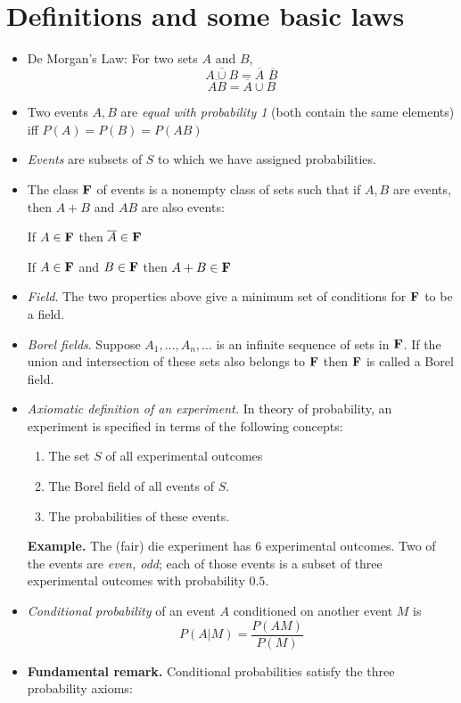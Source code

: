 \documentclass[a4paper, oneside]{book}
\begin{document}
\section{Definitions and some basic laws}
\begin{itemize}
\item De Morgan's Law: For two sets $A$ and $B$, $$\overline{A\cup B}=\overline{A}\,\,\overline{B}$$
$$\overline{AB}=\overline{A}\cup\overline{B}$$
\item Two events $A,B$ are \textit{equal with probability 1} (\ie both contain the same elements) iff $P(A)=P(B)=P(AB)$
\item \textit{Events} are subsets of $S$ to which we have assigned probabilities.
\item The class $\mathbf{F}$ of events is a nonempty class of sets such that if $A,B$ are events, then $A+B$ and $AB$ are also events:
\begin{center}If $A\in \mathbf{F}$ then $\overline{A}\in\mathbf{F}$\end{center}
\begin{center}If $A\in \mathbf{F}$ and $B\in \mathbf{F}$ then $A+B\in\mathbf{F}$ \end{center}
\item \textit{Field}. The two properties above give a minimum set of conditions for $\mathbf{F}$ to be a field. 
\item \textit{Borel fields}. Suppose $A_1, \hdots, A_n, \hdots$ is an infinite sequence of sets in $\mathbf{F}$. If the union and intersection of these sets also belongs to $\mathbf{F}$ then $\mathbf{F}$ is called a Borel field.  
\item \textit{Axiomatic definition of an experiment.} In theory of probability, an experiment is specified in terms of the following concepts:
\begin{enumerate}[1.]
\item The set $S$ of all experimental outcomes
\item The Borel field of all events of $S$.
\item The probabilities of these events.
\end{enumerate}
%
\textbf{Example.} The (fair) die experiment has 6 experimental outcomes. Two of the events are \textit{even, odd}; each of those events is a subset of three experimental outcomes with probability $0.5$.
\item \textit{Conditional probability} of an event $A$ conditioned on another event $M$ is $$P(A|M)=\frac{P(AM)}{P(M)}$$
\item \textbf{Fundamental remark.} Conditional probabilities satisfy the three probability axioms: 

\end{itemize}
\end{document}
